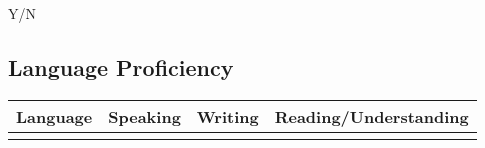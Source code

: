 Y/N

\subsection{Language Proficiency}

\begin{table}[H]
    \centering
    \begin{tabular}{|l|l|l|l|}
        \hline
        \rowcolor{lightgray}
        \textbf{Language} & \textbf{Speaking} & \textbf{Writing} & \textbf{Reading/Understanding} \\\hline
        \hline
        & & & \\\hline
    \end{tabular}
\end{table}






%
